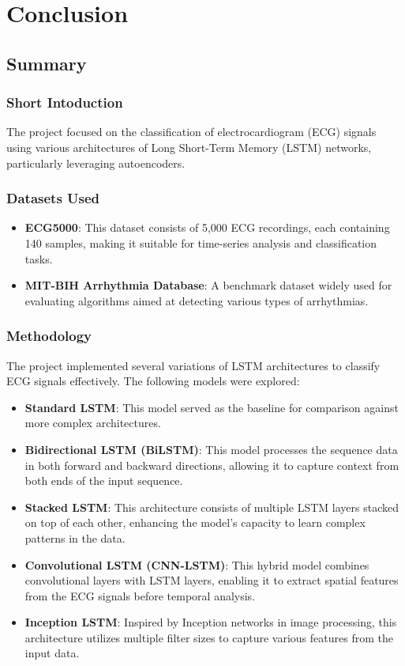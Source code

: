 \documentclass[nonacm,sigconf]{acmart}
\begin{document}
\section{Conclusion}
\subsection{Summary}
\subsubsection{\textbf{Short Intoduction}}
The project focused on the classification of electrocardiogram (ECG) signals using various architectures of Long Short-Term Memory (LSTM) networks, particularly leveraging autoencoders.

\subsubsection{\textbf{Datasets Used}}
\begin{itemize}
    \item \textbf{ECG5000}: This dataset consists of 5,000 ECG recordings, each containing 140 samples, making it suitable for time-series analysis and classification tasks.
    \item \textbf{MIT-BIH Arrhythmia Database}: A benchmark dataset widely used for evaluating algorithms aimed at detecting various types of arrhythmias.
\end{itemize}

\subsubsection{\textbf{Methodology}}
The project implemented several variations of LSTM architectures to classify ECG signals effectively. The following models were explored:
\begin{itemize}
    \item \textbf{Standard LSTM}: This model served as the baseline for comparison against more complex architectures.
    \item \textbf{Bidirectional LSTM (BiLSTM)}: This model processes the sequence data in both forward and backward directions, allowing it to capture context from both ends of the input sequence.
    \item \textbf{Stacked LSTM}: This architecture consists of multiple LSTM layers stacked on top of each other, enhancing the model's capacity to learn complex patterns in the data.
    \item \textbf{Convolutional LSTM (CNN-LSTM)}: This hybrid model combines convolutional layers with LSTM layers, enabling it to extract spatial features from the ECG signals before temporal analysis.
    \item \textbf{Inception LSTM}: Inspired by Inception networks in image processing, this architecture utilizes multiple filter sizes to capture various features from the input data.
\end{itemize}
\end{document}
